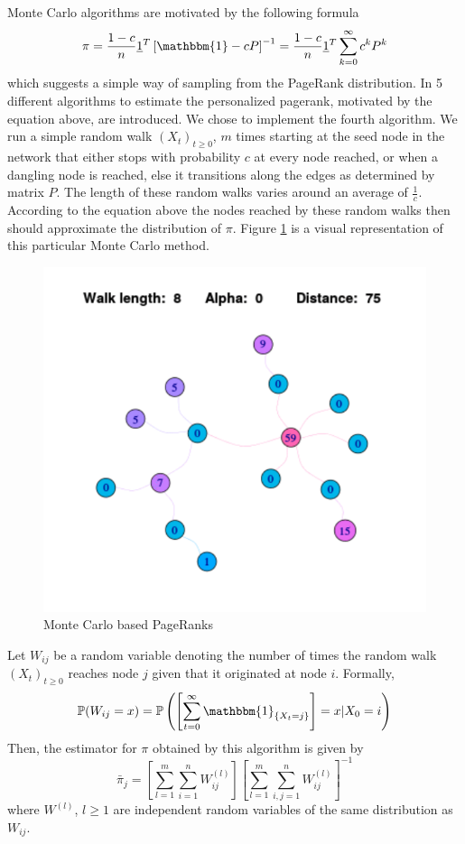 \documentclass[sigconf]{acmart}
\theoremstyle{definition}
\begin{document}
\noindent Monte Carlo algorithms are motivated by the following formula
\[
\pi = \frac{1-c}{n}\underline{1}^T\left[\mathbbm{1} - cP\right]^{-1} = \frac{1-c}{n}\underline{1}^{T}\sum_{k=0}^{\infty}c^kP^k 
\]
\noindent which suggests a simple way of sampling from the PageRank distribution. In \citep{Monte Carlo methods in PageRank computation: When one iteration is sufficient} 5 different algorithms to estimate the personalized pagerank, motivated by the equation above, are introduced. We chose to implement the fourth algorithm. We run a simple random walk $(X_t)_{t\geq{}0}$, $m$ times starting at the seed node in the network that either stops with probability $c$ at every node reached, or when a dangling node is reached, else it transitions along the edges as determined by matrix $P$. The length of these random walks varies around an average of $\frac{1}{c}$. According to the equation above the nodes reached by these random walks then should approximate the distribution of $\pi$. Figure  \ref{fig:RandomWalks} is a visual representation of this particular Monte Carlo method.
\begin{figure}
\includegraphics[scale=0.6]{PageRank}
\caption{Monte Carlo based PageRanks}
\label{fig:RandomWalks}
\end{figure}
Let $W_{ij}$ be a random variable denoting the number of times the random walk $(X_t)_{t\geq 0}$ reaches node $j$ given that it originated at node $i$. Formally,
\[ \mathbb{P}(W_{ij} = x) = \mathbb{P}\left(\left[\sum_{t=0}^{\infty}\mathbbm{1}_{\left\lbrace X_t=j\right\rbrace}\right]=x|X_0=i\right)
\]
Then, the estimator for $\pi$ obtained by this algorithm is given by
\[ 
\bar{\pi}_j = \left[\sum_{l=1}^{m}\sum_{i=1}^{n}W^{(l)}_{ij}\right]\left[\sum_{l=1}^{m}\sum_{i,j=1}^{n}W^{(l)}_{ij}\right]^{-1} 
\]
where $W^{(l)}$, $l\geq{}1$ are independent random variables of the same distribution as $W_{ij}$.\vspace{1em}\\
\end{document}
